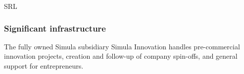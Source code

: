 \begin{sitedescription}{SRL}
\subsubsection*{Significant infrastructure}

The fully owned Simula subsidiary Simula Innovation handles pre-commercial
innovation projects, creation and follow-up of company spin-offs, and general
support for entrepreneurs.

\end{sitedescription}






